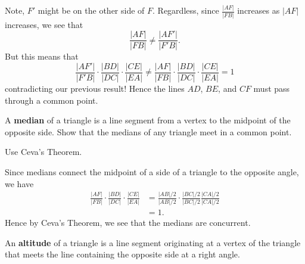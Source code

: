 \documentclass[newpage,hints,handout]{ximera}
\begin{document}
\begin{problem}
\begin{freeResponse}
\begin{image}
\end{image}
Note, $F'$ might be on the other side of $F$. Regardless, since
$\frac{|AF|}{|FB|}$ increases as $|AF|$ increases, we see that
\[
\frac{|AF|}{|FB|} \ne \frac{|AF'|}{|F'B|}.
\]
But this means that 
\[
\frac{|AF'|}{|F'B|}\cdot\frac{|BD|}{|DC|}\cdot\frac{|CE|}{|EA|}\ne\frac{|AF|}{|FB|}\cdot\frac{|BD|}{|DC|}\cdot\frac{|CE|}{|EA|}=1
\]
contradicting our previous result! Hence the lines $AD$, $BE$, and $CF$ must
pass through a common point.
\end{freeResponse}
\end{problem}

\begin{problem}
A \textbf{median} of a triangle is a line segment from a vertex
to the midpoint of the opposite side. Show that the medians of any triangle
meet in a common point.

\begin{hint}
Use Ceva's Theorem.
\end{hint}
\begin{freeResponse}
Since medians connect the midpoint of a side of a triangle to the
opposite angle, we have
\begin{align*}
\frac{|AF|}{|FB|}\cdot\frac{|BD|}{|DC|}\cdot\frac{|CE|}{|EA|} &= 
\frac{|AB|/2}{|AB|/2}\cdot\frac{|BC|/2}{|BC|/2}\frac{|CA|/2}{|CA|/2}\\
&= 1.
\end{align*}
Hence by Ceva's Theorem, we see that the medians are concurrent. 
\end{freeResponse}
\end{problem}

\begin{definition} 
An \textbf{altitude} of a triangle is a line segment originating at a
vertex of the triangle that meets the line containing the opposite
side at a right angle.
\end{definition}
\end{document}
